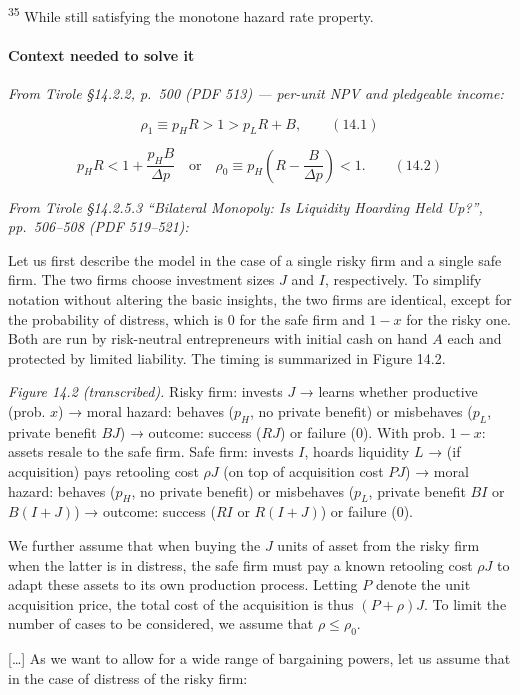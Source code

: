 \documentclass[11pt,a4paper]{article}
\begin{document}
\textsuperscript{35} While still satisfying the monotone hazard rate property.

\paragraph{Context needed to solve it}

\emph{From Tirole §14.2.2, p.~500 (PDF 513) --- per-unit NPV and pledgeable income:}

\[\rho_1 \equiv p_H R > 1 > p_L R + B, \qquad (14.1)\]

\[p_H R < 1 + \frac{p_H B}{\Delta p} \quad\text{or}\quad \rho_0 \equiv p_H\left(R - \frac{B}{\Delta p}\right) < 1. \qquad (14.2)\]

\emph{From Tirole §14.2.5.3 ``Bilateral Monopoly: Is Liquidity Hoarding Held Up?'', pp.~506--508
(PDF 519--521):}

Let us first describe the model in the case of a single risky firm and a single safe firm. The two
firms choose investment sizes \(J\) and \(I\), respectively. To simplify notation without altering
the basic insights, the two firms are identical, except for the probability of distress, which is 0
for the safe firm and \(1 - x\) for the risky one. Both are run by risk-neutral entrepreneurs with
initial cash on hand \(A\) each and protected by limited liability. The timing is summarized in
Figure 14.2.

\emph{Figure 14.2 (transcribed).} Risky firm: invests \(J\) → learns whether productive (prob.
\(x\)) → moral hazard: behaves (\(p_H\), no private benefit) or misbehaves (\(p_L\), private benefit
\(BJ\)) → outcome: success (\(RJ\)) or failure (0). With prob. \(1 - x\): assets resale to the safe
firm. Safe firm: invests \(I\), hoards liquidity \(L\) → (if acquisition) pays retooling cost
\(\rho J\) (on top of acquisition cost \(PJ\)) → moral hazard: behaves (\(p_H\), no private benefit)
or misbehaves (\(p_L\), private benefit \(BI\) or \(B(I + J)\)) → outcome: success (\(RI\) or
\(R(I + J)\)) or failure (0).

We further assume that when buying the \(J\) units of asset from the risky firm when the latter is
in distress, the safe firm must pay a known retooling cost \(\rho J\) to adapt these assets to its
own production process. Letting \(P\) denote the unit acquisition price, the total cost of the
acquisition is thus \((P + \rho)J\). To limit the number of cases to be considered, we assume that
\(\rho \leqslant \rho_0\).

{[}\ldots{]} As we want to allow for a wide range of bargaining powers, let us assume that in the
case of distress of the risky firm:
\end{document}
